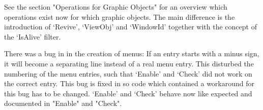 See the section "Operations for Graphic Objects" for an overview
which operations exist now for which graphic objects. The main difference
is the introduction of `Revive', `ViewObj' and `WindowId' together with the 
concept of the `IsAlive' filter.

There was a bug in {} in the creation of menus: If an entry starts
with a minus sign, it will become a separating line instead of a real menu
entry. This disturbed the numbering of the menu entries, such that `Enable' 
and `Check' did not work on the correct entry. This bug is fixed in
{} so code which contained a workaround for this bug has to be
changed. `Enable' and `Check' behave now like expected and documented in
"Enable" and "Check".

